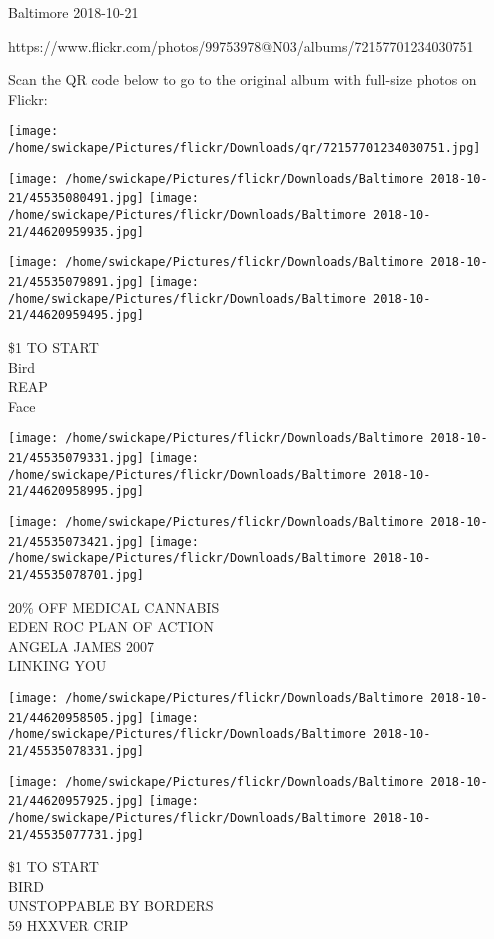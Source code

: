\documentclass[10pt,letterpaper]{article}
\begin{document}
Baltimore 2018-10-21

https://www.flickr.com/photos/99753978@N03/albums/72157701234030751

Scan the QR code below to go to the original album with full-size photos on Flickr:

\texttt{[image: /home/swickape/Pictures/flickr/Downloads/qr/72157701234030751.jpg]}
\pagebreak

\texttt{[image: /home/swickape/Pictures/flickr/Downloads/Baltimore 2018-10-21/45535080491.jpg]}
\texttt{[image: /home/swickape/Pictures/flickr/Downloads/Baltimore 2018-10-21/44620959935.jpg]}

\texttt{[image: /home/swickape/Pictures/flickr/Downloads/Baltimore 2018-10-21/45535079891.jpg]}
\texttt{[image: /home/swickape/Pictures/flickr/Downloads/Baltimore 2018-10-21/44620959495.jpg]}

\$1 TO START\\
Bird\\
REAP\\
Face\\
\pagebreak

\texttt{[image: /home/swickape/Pictures/flickr/Downloads/Baltimore 2018-10-21/45535079331.jpg]}
\texttt{[image: /home/swickape/Pictures/flickr/Downloads/Baltimore 2018-10-21/44620958995.jpg]}

\texttt{[image: /home/swickape/Pictures/flickr/Downloads/Baltimore 2018-10-21/45535073421.jpg]}
\texttt{[image: /home/swickape/Pictures/flickr/Downloads/Baltimore 2018-10-21/45535078701.jpg]}

20\% OFF MEDICAL CANNABIS\\
EDEN ROC PLAN OF ACTION\\
ANGELA JAMES 2007\\
LINKING YOU\\
\pagebreak

\texttt{[image: /home/swickape/Pictures/flickr/Downloads/Baltimore 2018-10-21/44620958505.jpg]}
\texttt{[image: /home/swickape/Pictures/flickr/Downloads/Baltimore 2018-10-21/45535078331.jpg]}

\texttt{[image: /home/swickape/Pictures/flickr/Downloads/Baltimore 2018-10-21/44620957925.jpg]}
\texttt{[image: /home/swickape/Pictures/flickr/Downloads/Baltimore 2018-10-21/45535077731.jpg]}

\$1 TO START\\
BIRD\\
UNSTOPPABLE BY BORDERS\\
59 HXXVER CRIP\\
\pagebreak
\end{document}
